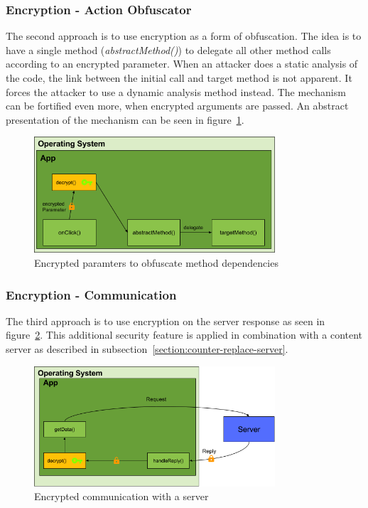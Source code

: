 \subsubsection{Encryption - Action Obfuscator} \label{subsubsectionection:counter-replace-encryption-content-obfuscator}
The second approach is to use encryption as a form of obfuscation.
The idea is to have a single method (\textit{abstractMethod()}) to delegate all other method calls according to an encrypted parameter.
\newline
When an attacker does a static analysis of the code, the link between the initial call and target method is not apparent.
It forces the attacker to use a dynamic analysis method instead.
The mechanism can be fortified even more, when encrypted arguments are passed.
\newline
An abstract presentation of the mechanism can be seen in figure~\ref{fig:encryptionAction}.
\begin{figure}[h]
    \centering
    \includegraphics[width=0.8\textwidth]{data/encryptionAction.png}
    \caption{Encrypted paramters to obfuscate method dependencies}
    \label{fig:encryptionAction}
\end{figure}
\newpage
\subsubsection{Encryption - Communication} \label{section:counter-replace-encryption-content-communication}
The third approach is to use encryption on the server response as seen in figure~\ref{fig:encryptionComm}.
This additional security feature is applied in combination with a content server as described in subsection~\ref{section:counter-replace-server}.
\newline
\begin{figure}[h]
    \centering
    \includegraphics[width=0.8\textwidth]{data/encryptionComm.png}
    \caption{Encrypted communication with a server}
    \label{fig:encryptionComm}
\end{figure}
